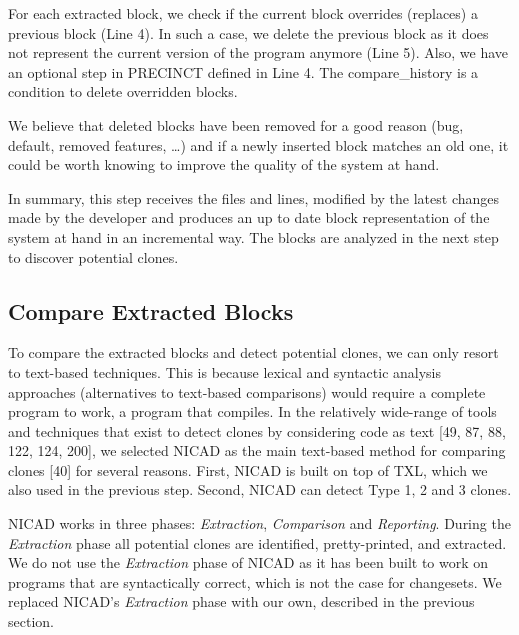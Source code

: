 \documentclass[12pt]{report}
\begin{document}
For each extracted block, we check if the current block overrides
(replaces) a previous block (Line 4). In such a case, we delete the
previous block as it does not represent the current version of the
program anymore (Line 5). Also, we have an optional step in PRECINCT
defined in Line 4. The compare\_history is a condition to delete
overridden blocks.

We believe that deleted blocks have been removed for a good reason (bug,
default, removed features, \ldots{}) and if a newly inserted block
matches an old one, it could be worth knowing to improve the quality of
the system at hand.

In summary, this step receives the files and lines, modified by the
latest changes made by the developer and produces an up to date block
representation of the system at hand in an incremental way. The blocks
are analyzed in the next step to discover potential clones.



\subsection{Compare Extracted Blocks}\label{compare-extracted-blocks}

To compare the extracted blocks and detect potential clones, we can only
resort to text-based techniques. This is because lexical and syntactic
analysis approaches (alternatives to text-based comparisons) would
require a complete program to work, a program that compiles. In the
relatively wide-range of tools and techniques that exist to detect
clones by considering code as text {[}49, 87, 88, 122, 124, 200{]}, we
selected NICAD as the main text-based method for comparing clones
{[}40{]} for several reasons. First, NICAD is built on top of TXL, which
we also used in the previous step. Second, NICAD can detect Type 1, 2
and 3 clones.

NICAD works in three phases: \emph{Extraction}, \emph{Comparison} and
\emph{Reporting}. During the \emph{Extraction} phase all potential
clones are identified, pretty-printed, and extracted. We do not use the
\emph{Extraction} phase of NICAD as it has been built to work on
programs that are syntactically correct, which is not the case for
changesets. We replaced NICAD's \emph{Extraction} phase with our own,
described in the previous section.
\end{document}
